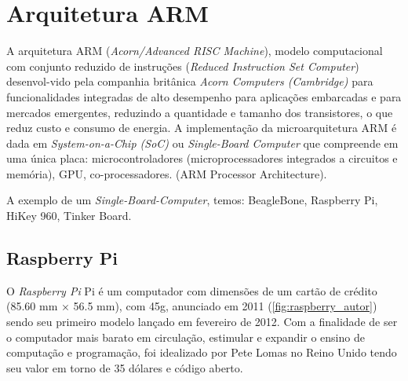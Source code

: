 \documentclass[12pt,oneside,a4paper,chapter=TITLE,section=TITLE,sumario=tradicional]{abntex2}
\begin{document}
\section{Arquitetura ARM}
A arquitetura ARM (\textit{Acorn/Advanced RISC Machine}), modelo computacional com conjunto reduzido de instruções (\textit{Reduced Instruction Set Computer}) desenvol-vido pela companhia britânica \textit{Acorn Computers (Cambridge)} para funcionalidades integradas de alto desempenho para aplicações embarcadas e para mercados emergentes, reduzindo a quantidade e tamanho dos transistores, o que reduz custo e consumo de energia. 
A implementação da microarquitetura ARM é dada em \textit{System-on-a-Chip (SoC)} ou \textit{Single-Board Computer} que compreende em uma única placa: microcontroladores (microprocessadores integrados a circuitos e memória), GPU, co-processadores. 
(ARM Processor Architecture).

A exemplo de um \textit{Single-Board-Computer}, temos: BeagleBone, Raspberry Pi, HiKey 960, Tinker Board.

\subsection{Raspberry Pi}
O \textit{Raspberry Pi} Pi é um computador com dimensões de um cartão de crédito (85.60 mm × 56.5 mm), com 45g, anunciado em 2011 (\autoref{fig:raspberry_autor}) sendo seu primeiro modelo lançado em fevereiro de 2012. Com a finalidade de ser o computador mais barato em circulação, estimular e expandir o ensino de computação e programação, foi idealizado por Pete Lomas no Reino Unido tendo seu valor em torno de 35 dólares e código aberto.

\begin{figure}[htb]
\end{figure}
\end{document}
